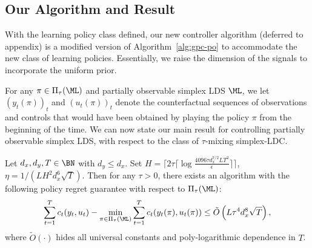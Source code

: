 \subsection{Our Algorithm and Result}

With the learning policy class defined, our new controller algorithm (deferred to appendix) is a modified version of Algorithm~\ref{alg:gpc-po} to accommodate the new class of learning policies. Essentially, we raise the dimension of the signals to incorporate the uniform prior.  

For any $\pi \in \Pi_{\tau}(\ML)$ and partially observable simplex LDS $\ML$, we let $(y_t(\pi))_t$ and $(u_t(\pi))_t$ denote the counterfactual sequences of observations and controls that would have been obtained by playing the policy $\pi$ from the beginning of the time. We can now state our main result for controlling partially observable simplex LDS, with respect to the class of $\tau$-mixing simplex-LDC.

\begin{theorem} 
\label{thm:po-main-ldc-simplex} 
Let $d_x,d_y, T\in\BN$ with $d_y\leq d_x$. %
Set $H=\lceil 2\tau\lceil \log\frac{4096\tau d_x^{7/2} L T^2}{\epsilon}\rceil \rceil$, $\eta=1/(LH^{2}d_x^{6}\sqrt{T})$. Then for any $\tau > 0$, there exists an algorithm with the following policy regret guarantee with respect to $\Pi_{\tau}(\ML)$: \begin{align*}
\sum_{t=1}^T c_t(y_t,u_t)-\min_{\pi\in\Pi_{\tau}(\ML)}\sum_{t=1}^T c_t(y_t(\pi),u_t(\pi))\le \tilde{O}\left(L\tau^{4}d_x^{8}\sqrt{T}\right),
\end{align*}
where $\tilde{O}(\cdot)$ hides all universal constants and poly-logarithmic dependence in $T$. 
\end{theorem}

